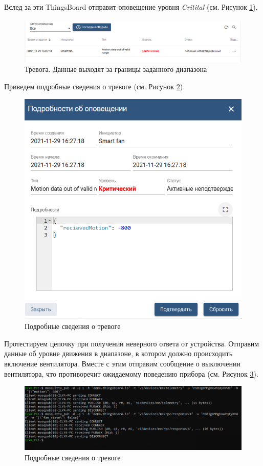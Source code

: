 \documentclass[a4paper,14pt]{extarticle}
\begin{document}
Вслед за эти ThingsBoard отправит оповещение уровня \textit{Critital} (см. Рисунок \ref{fig:alarm-input-value}).

\begin{figure}[h!]
	\centering
	\includegraphics[width=1\linewidth]{images/alarm-input-value}
	\caption{Тревога. Данные выходят за границы заданного диапазона}
	\label{fig:alarm-input-value}
\end{figure}

Приведем подробные сведения о тревоге (см. Рисунок \ref{fig:alarm-input-value-detail}).


\begin{figure}[h!]
	\centering
	\includegraphics[width=0.7\linewidth]{images/alarm-input-value-detail}
	\caption{Подробные сведения о тревоге}
	\label{fig:alarm-input-value-detail}
\end{figure}

\newpage
Протестируем цепочку при получении неверного ответа от устройства. Отправим данные об уровне движения в диапазоне, в котором должно происходить включение вентилятора. Вместе с этим отправим сообщение о выключении вентилятора, что противоречит ожидаемому поведению прибора (см. Рисунок \ref{fig:listen-p2}).

\begin{figure}[h!]
	\centering
	\includegraphics[width=1\linewidth]{images/listen-p2}
	\caption{Подробные сведения о тревоге}
	\label{fig:listen-p2}
\end{figure}
\end{document}
